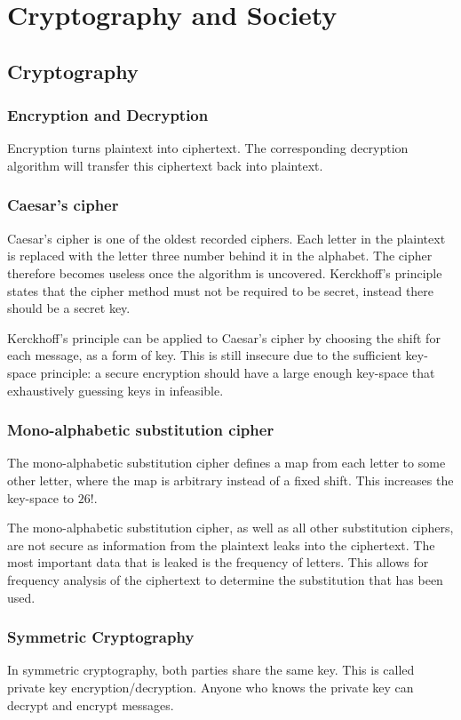 \chapter{Cryptography and Society}

\section{Cryptography}
\subsection{Encryption and Decryption}
Encryption turns plaintext into ciphertext. The corresponding decryption algorithm will transfer this ciphertext back into plaintext.

\subsection{Caesar's cipher}
Caesar's cipher is one of the oldest recorded ciphers. Each letter in the plaintext is replaced with the letter three number behind it in the alphabet. The cipher therefore becomes useless once the algorithm is uncovered. Kerckhoff's principle states that the cipher method must not be required to be secret, instead there should be a secret key.

Kerckhoff's principle can be applied to Caesar's cipher by choosing the shift for each message, as a form of key. This is still insecure due to the sufficient key-space principle: a secure encryption should have a large enough key-space that exhaustively guessing keys in infeasible.

\subsection{Mono-alphabetic substitution cipher}
The mono-alphabetic substitution cipher defines a map from each letter to some other letter, where the map is arbitrary instead of a fixed shift. This increases the key-space to \(26!\).

The mono-alphabetic substitution cipher, as well as all other substitution ciphers, are not secure as information from the plaintext leaks into the ciphertext. The most important data that is leaked is the frequency of letters. This allows for frequency analysis of the ciphertext to determine the substitution that has been used.

\subsection{Symmetric Cryptography}
In symmetric cryptography, both parties share the same key. This is called private key encryption/decryption. Anyone who knows the private key can decrypt and encrypt messages.

